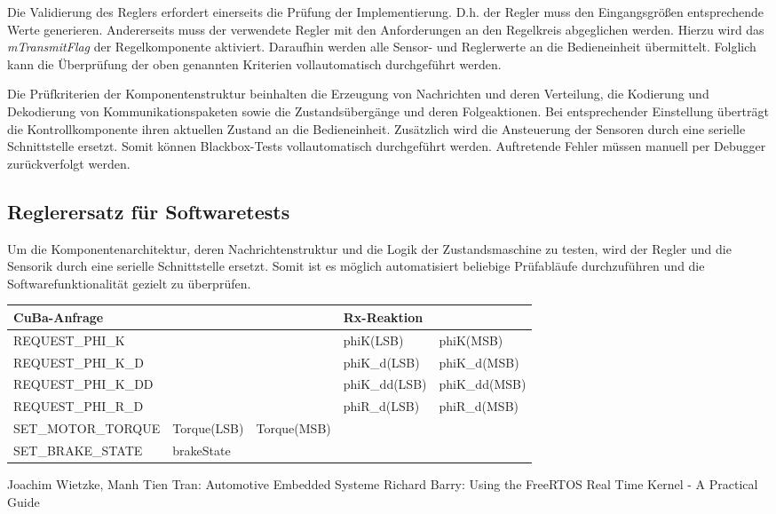 \documentclass{article}
\begin{document}
Die Validierung des Reglers erfordert einerseits die Prüfung der Implementierung. D.h. der Regler muss den Eingangsgrößen entsprechende Werte generieren. Andererseits muss der verwendete Regler mit den Anforderungen an den Regelkreis abgeglichen werden. Hierzu wird das \textit{mTransmitFlag} der Regelkomponente aktiviert. Daraufhin werden alle Sensor- und Reglerwerte an die Bedieneinheit übermittelt. Folglich kann die Überprüfung der oben genannten Kriterien vollautomatisch durchgeführt werden.

Die Prüfkriterien der Komponentenstruktur beinhalten die Erzeugung von Nachrichten und deren Verteilung, die Kodierung und Dekodierung von Kommunikationspaketen sowie die Zustandsübergänge und deren Folgeaktionen. Bei entsprechender Einstellung überträgt die Kontrollkomponente ihren aktuellen Zustand an die Bedieneinheit. Zusätzlich wird die Ansteuerung der Sensoren durch eine serielle Schnittstelle ersetzt. Somit können Blackbox-Tests vollautomatisch durchgeführt werden. Auftretende Fehler müssen manuell per Debugger zurückverfolgt werden.


\subsection*{Reglerersatz für Softwaretests}
Um die Komponentenarchitektur, deren Nachrichtenstruktur und die Logik der Zustandsmaschine zu testen, wird der Regler und die Sensorik durch eine serielle Schnittstelle ersetzt. Somit ist es möglich automatisiert beliebige Prüfabläufe durchzuführen und die Softwarefunktionalität gezielt zu überprüfen.

\begin{table}[h]
\centering
\label{my-label}
\begin{tabular}{|l|l|l|l|l|}
\hline
\textbf{CuBa-Anfrage} & \textbf{}   & \textbf{}   & \textbf{Rx-Reaktion} &               \\ \hline
REQUEST\_PHI\_K       &             &             & phiK(LSB)            & phiK(MSB)     \\ \hline
REQUEST\_PHI\_K\_D    &             &             & phiK\_d(LSB)         & phiK\_d(MSB)  \\ \hline
REQUEST\_PHI\_K\_DD   &             &             & phiK\_dd(LSB)        & phiK\_dd(MSB) \\ \hline
REQUEST\_PHI\_R\_D    &             &             & phiR\_d(LSB)         &  phiR\_d(MSB) \\ \hline
SET\_MOTOR\_TORQUE    & Torque(LSB) & Torque(MSB) &                      &               \\ \hline
SET\_BRAKE\_STATE     & brakeState  &             &                      &               \\ \hline
\end{tabular}
\end{table}

\newpage
\begin{thebibliography}{\hspace{0.5cm}}
	 Joachim Wietzke, Manh Tien Tran: Automotive Embedded Systeme
	 Richard Barry: Using the FreeRTOS Real Time Kernel - A Practical Guide
\end{thebibliography}
\end{document}
